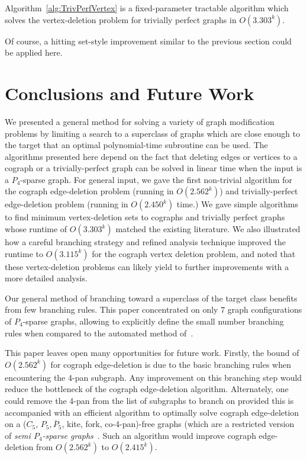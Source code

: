 \documentclass{llncs}
\begin{document}
\begin{theorem}
Algorithm~\ref{alg:TrivPerfVertex} is a fixed-parameter tractable algorithm which solves the vertex-deletion problem for trivially perfect graphs in $O(3.303^k)$.
\end{theorem}

Of course, a hitting set-style improvement similar to the previous section could be applied here.

\section{Conclusions and Future Work}

We presented a general method for solving a variety of graph modification problems by limiting a search to a superclass of graphs which are close enough to the target that an optimal polynomial-time subroutine can be used. The algorithms presented here depend on the fact that deleting edges or vertices to a cograph or a trivially-perfect graph can be solved in linear time when the input is a $P_4$-sparse graph. For general input, we gave the first non-trivial algorithm for the cograph edge-deletion problem (running in $O(2.562^k)$) and trivially-perfect edge-deletion problem (running in $O(2.450^k)$ time.) We gave simple algorithms to find minimum vertex-deletion sets to cographs and trivially perfect graphs whose runtime of $O(3.303^k)$ matched the existing literature. We also illustrated how a careful branching strategy and refined analysis technique improved the runtime to $O(3.115^k)$ for the cograph vertex deletion problem, and noted that these vertex-deletion problems can likely yield to further improvements with a more detailed analysis.

Our general method of branching toward a superclass of the target class benefits from few branching rules. This paper concentrated on only 7 graph configurations of $P_4$-sparse graphs, allowing to explicitly define the small number branching rules when compared to the automated method of~\cite{GGHN}.

This paper leaves open many opportunities for future work. Firstly, the bound of $O(2.562^k)$ for cograph edge-deletion is due to the basic branching rules when encountering the 4-pan subgraph. Any improvement on this branching step would reduce the bottleneck of the cograph edge-deletion algorithm. Alternately, one could remove the 4-pan from the list of subgraphs to branch on provided this is accompanied with an efficient algorithm to optimally solve cograph edge-deletion on a ($C_5$, $P_5, \overline{P}_5$, kite, fork, co-4-pan)-free graphs (which are a restricted version of \emph{semi $P_4$-sparse graphs}~\cite{FG}. Such an algorithm would improve cograph edge-deletion from $O(2.562^k)$ to $O(2.415^k)$.
\end{document}
